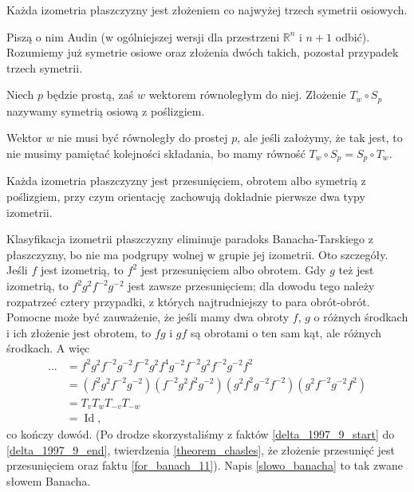 
\begin{theorem}[Chasles'a, 1830]
%
\label{theorem_chasles}
    Każda izometria płaszczyzny jest złożeniem co najwyżej trzech symetrii osiowych.
\end{theorem}

Piszą o nim Audin \cite[s. 49]{audin_2003} (w ogólniejszej wersji dla przestrzeni $\mathbb R^n$ i $n+1$ odbić).
Rozumiemy już symetrie osiowe oraz złożenia dwóch takich, pozostał przypadek trzech symetrii.

\begin{definition}
    Niech $p$ będzie prostą, zaś $w$ wektorem równoległym do niej.
    Złożenie $T_w \circ S_p$ nazywamy symetrią osiową z poślizgiem.
\end{definition}

Wektor $w$ nie musi być równoległy do prostej $p$, ale jeśli założymy, że tak jest, to nie musimy pamiętać kolejności składania, bo mamy równość $T_w \circ S_p = S_p \circ T_w$.

\begin{corollary}
    Każda izometria płaszczyzny jest przesunięciem, obrotem albo symetrią z poślizgiem, przy czym orientację zachowują dokładnie pierwsze dwa typy izometrii.
\end{corollary}

Klasyfikacja izometrii płaszczyzny eliminuje paradoks Banacha-Tarskiego z płaszczyzny, bo nie ma podgrupy wolnej w grupie jej izometrii.
Oto szczegóły.
Jeśli $f$ jest izometrią, to $f^2$ jest przesunięciem albo obrotem.
Gdy $g$ też jest izometrią, to $f^2g^2f^{-2}g^{-2}$ jest zawsze przesunięciem; dla dowodu tego należy rozpatrzeć cztery przypadki, z których najtrudniejszy to para obrót-obrót.
Pomocne może być zauważenie, że jeśli mamy dwa obroty $f$, $g$ o różnych środkach i ich złożenie jest obrotem, to $fg$ i $gf$ są obrotami o ten sam kąt, ale różnych środkach.
A więc 
\begin{align}
    \ldots & = f^2 g^2 f^{-2} g^{-2} f^{-2} g^2 f^4 g^{-2} f^{-2} g^2 f^{-2} g^{-2} f^2 \label{slowo_banacha} \\
    & = (f^2 g^2 f^{-2} g^{-2})( f^{-2} g^2 f^2 g^{-2}) (g^2 f^2g^{-2} f^{-2} ) (g^2 f^{-2} g^{-2} f^2) \\
    & = T_v T_w T_{-v} T_{-w} \\
    & = \operatorname{Id},
\end{align}
co kończy dowód.
(Po drodze skorzystaliśmy z faktów \ref{delta_1997_9_start} do \ref{delta_1997_9_end}, twierdzenia \ref{theorem_chasles}, że złożenie przesunięć jest przesunięciem oraz faktu \ref{for_banach_11}).
Napis \ref{slowo_banacha} to tak zwane słowem Banacha.

